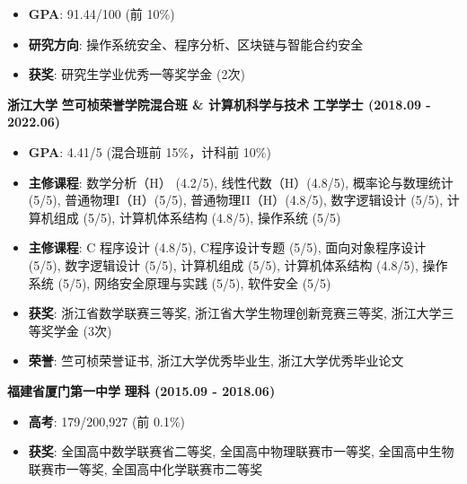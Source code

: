     \begin{itemize}
        \item \textbf{GPA}: 91.44/100 (前 10\%)
        \item \textbf{研究方向}: 操作系统安全、程序分析、区块链与智能合约安全
        \item \textbf{获奖}: 研究生学业优秀一等奖学金 (2次)
    \end{itemize}

    \noindent \textbf{浙江大学} \textbar{} \textbf{竺可桢荣誉学院混合班 \& 计算机科学与技术} \textbar{} \textbf{工学学士 (2018.09 - 2022.06)}

    \begin{itemize}
        \item \textbf{GPA}: 4.41/5 (混合班前 15\%，计科前 10\%)

              \ifdefined\qr

        \item \textbf{主修课程}: 数学分析（H） (4.2/5), 线性代数（H）(4.8/5), 概率论与数理统计(5/5), 普通物理I（H）(5/5), 普通物理II（H）(4.8/5), 数字逻辑设计
              (5/5), 计算机组成 (5/5), 计算机体系结构 (4.8/5), 操作系统 (5/5)

              \else

        \item \textbf{主修课程}: C 程序设计 (4.8/5), C程序设计专题 (5/5), 面向对象程序设计 (5/5), 数字逻辑设计 (5/5), 计算机组成 (5/5), 计算机体系结构 (4.8/5),
              操作系统 (5/5), 网络安全原理与实践 (5/5), 软件安全 (5/5)

              \fi

        \item \textbf{获奖}: 浙江省数学联赛三等奖, 浙江省大学生物理创新竞赛三等奖, 浙江大学三等奖学金 (3次)
        \item \textbf{荣誉}: 竺可桢荣誉证书, 浙江大学优秀毕业生, 浙江大学优秀毕业论文
    \end{itemize}

    \noindent \textbf{福建省厦门第一中学} \textbar{} \textbf{理科 (2015.09 - 2018.06)}

    \begin{itemize}
        \item \textbf{高考}: 179/200,927 (前 0.1\%)
        \item \textbf{获奖}: 全国高中数学联赛省二等奖, 全国高中物理联赛市一等奖, 全国高中生物联赛市一等奖, 全国高中化学联赛市二等奖
    \end{itemize}

\fi

